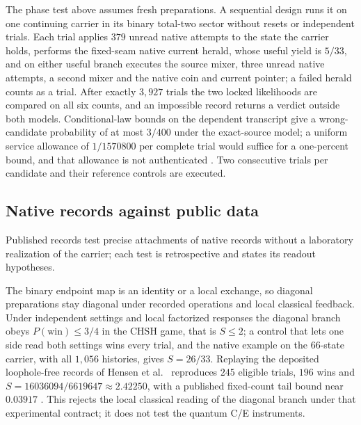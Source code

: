 \documentclass[11pt]{article}
\theoremstyle{definition}
\theoremstyle{remark}
\theoremstyle{plain}
\begin{document}
The phase test above assumes fresh preparations. A sequential design runs it
on one continuing carrier in its binary total-two sector without resets or
independent trials. Each trial applies $379$ unread native attempts to the
state the carrier holds, performs the fixed-seam native current herald, whose
useful yield is $5/33$, and on either useful branch executes the source
mixer, three unread native attempts, a second mixer and the native coin and
current pointer; a failed herald counts as a trial. After exactly $3{,}927$
trials the two locked likelihoods are compared on all six counts, and an
impossible record returns a verdict outside both models. Conditional-law
bounds on the dependent transcript give a wrong-candidate probability of at
most $3/400$ under the exact-source model; a uniform service allowance of
$1/1570800$ per complete trial would suffice for a one-percent bound, and
that allowance is not authenticated \cite{nativeProtocol}. Two consecutive
trials per candidate and their reference controls are executed.

\subsection{Native records against public data}
\label{sec:public-records}

Published records test precise attachments of native records without a
laboratory realization of the carrier; each test is retrospective and states
its readout hypotheses.

The binary endpoint map is an identity or a local exchange, so diagonal
preparations stay diagonal under recorded operations and local classical
feedback. Under independent settings and local factorized responses the
diagonal branch obeys $P(\mathrm{win})\le3/4$ in the CHSH game, that is
$S\le2$; a control that lets one side read both settings wins every trial,
and the native example on the 66-state carrier, with all $1{,}056$ histories,
gives $S=26/33$. Replaying the deposited loophole-free records of Hensen et
al.\ \cite{hensen2015} reproduces $245$ eligible trials, $196$ wins and
$S=16036094/6619647\approx2.42250$, with a published fixed-count tail bound
near $0.03917$ \cite{nativeBell}. This rejects the local classical reading of
the diagonal branch under that experimental contract; it does not test the
quantum C/E instruments.
\end{document}
